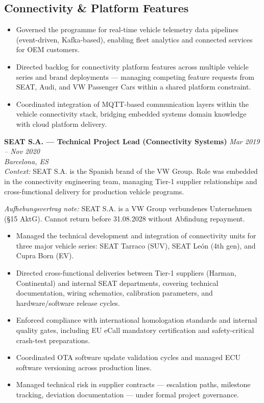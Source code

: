 \documentclass[10pt,a4paper]{article}
\newcommand{\roleentry}[3]{%
  \vspace{4pt}%
  \textbf{#1} \hfill \textit{#2}\\%
  \textit{\small #3}\\[-2pt]%
}
\begin{document}
\subsection*{Connectivity \& Platform Features}

\begin{itemize}
  \item Governed the programme for real-time vehicle telemetry data pipelines (event-driven,
        Kafka-based), enabling fleet analytics and connected services for OEM customers.
  \item Directed backlog for connectivity platform features across multiple vehicle series and
        brand deployments — managing competing feature requests from SEAT, Audi, and VW
        Passenger Cars within a shared platform constraint.
  \item Coordinated integration of MQTT-based communication layers within the vehicle connectivity
        stack, bridging embedded systems domain knowledge with cloud platform delivery.
\end{itemize}

\vspace{8pt}

\roleentry{SEAT S.A. — Technical Project Lead (Connectivity Systems)}
  {Mar 2019 – Nov 2020}
  {Barcelona, ES}

\textit{Context:} SEAT S.A. is the Spanish brand of the VW Group. Role was embedded in the
connectivity engineering team, managing Tier-1 supplier relationships and cross-functional
delivery for production vehicle programs.

\textit{Aufhebungsvertrag note:} SEAT S.A. is a VW Group verbundenes Unternehmen (§15 AktG).
Cannot return before 31.08.2028 without Abfindung repayment.

\begin{itemize}
  \item Managed the technical development and integration of connectivity units for three major
        vehicle series: SEAT Tarraco (SUV), SEAT León (4th gen), and Cupra Born (EV).
  \item Directed cross-functional deliveries between Tier-1 suppliers (Harman, Continental)
        and internal SEAT departments, covering technical documentation, wiring schematics,
        calibration parameters, and hardware/software release cycles.
  \item Enforced compliance with international homologation standards and internal quality gates,
        including EU eCall mandatory certification and safety-critical crash-test preparations.
  \item Coordinated OTA software update validation cycles and managed ECU software versioning
        across production lines.
  \item Managed technical risk in supplier contracts — escalation paths, milestone tracking,
        deviation documentation — under formal project governance.
\end{itemize}
\end{document}
